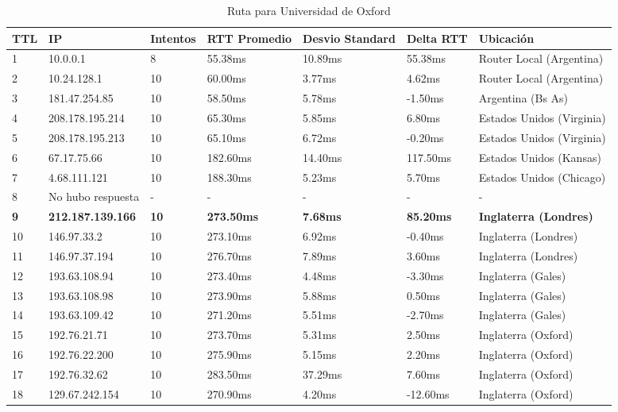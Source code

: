 \begin{table}[H]
	\centering
	\caption{Ruta para Universidad de Oxford}
	\label{table:ruta-inglaterra}
	\begin{tabular}{|l|l|l|l|l|l|l|}
		\hline
		TTL & IP & Intentos & RTT Promedio & Desvio Standard & Delta RTT & Ubicación \\ \hline 
		1 & 10.0.0.1 & 8 & 55.38ms & 10.89ms & 55.38ms & Router Local (Argentina) \\ \hline 
		2 & 10.24.128.1 & 10 & 60.00ms & 3.77ms & 4.62ms & Router Local (Argentina) \\ \hline 
		3 & 181.47.254.85 & 10 & 58.50ms & 5.78ms & -1.50ms & Argentina (Bs As) \\ \hline 
		4 & 208.178.195.214 & 10 & 65.30ms & 5.85ms & 6.80ms & Estados Unidos (Virginia) \\ \hline 
		5 & 208.178.195.213 & 10 & 65.10ms & 6.72ms & -0.20ms & Estados Unidos (Virginia) \\ \hline 
		6 & 67.17.75.66 & 10 & 182.60ms & 14.40ms & 117.50ms & Estados Unidos (Kansas) \\ \hline 
		7 & 4.68.111.121 & 10 & 188.30ms & 5.23ms & 5.70ms & Estados Unidos (Chicago) \\ \hline 
		8 & No hubo respuesta & - & - & - & - & - \\ \hline 
		\textbf{9} & \textbf{212.187.139.166} & \textbf{10} & \textbf{273.50ms} & \textbf{7.68ms} & \textbf{85.20ms} & \textbf{Inglaterra (Londres)} \\ \hline 
		10 & 146.97.33.2 & 10 & 273.10ms & 6.92ms & -0.40ms & Inglaterra (Londres) \\ \hline 
		11 & 146.97.37.194 & 10 & 276.70ms & 7.89ms & 3.60ms & Inglaterra (Londres) \\ \hline 
		12 & 193.63.108.94 & 10 & 273.40ms & 4.48ms & -3.30ms & Inglaterra (Gales) \\ \hline 
		13 & 193.63.108.98 & 10 & 273.90ms & 5.88ms & 0.50ms & Inglaterra (Gales) \\ \hline 
		14 & 193.63.109.42 & 10 & 271.20ms & 5.51ms & -2.70ms & Inglaterra (Gales) \\ \hline 
		15 & 192.76.21.71 & 10 & 273.70ms & 5.31ms & 2.50ms & Inglaterra (Oxford) \\ \hline 
		16 & 192.76.22.200 & 10 & 275.90ms & 5.15ms & 2.20ms & Inglaterra (Oxford) \\ \hline 
		17 & 192.76.32.62 & 10 & 283.50ms & 37.29ms & 7.60ms & Inglaterra (Oxford) \\ \hline 
		18 & 129.67.242.154 & 10 & 270.90ms & 4.20ms & -12.60ms & Inglaterra (Oxford) \\ \hline
	\end{tabular}
\end{table}

